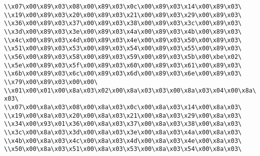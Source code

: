 \verb|\\x07\x00\x89\x03\x08\x00\x89\x03\x0c\x00\x89\x03\x14\x00\x89\x03\|\newline
\verb|\\x19\x00\x89\x03\x20\x00\x89\x03\x21\x00\x89\x03\x29\x00\x89\x03\|\newline
\verb|\\x36\x00\x89\x03\x37\x00\x89\x03\x38\x00\x89\x03\x3c\x00\x89\x03\|\newline
\verb|\\x3d\x00\x89\x03\x3e\x00\x89\x03\x4a\x00\x89\x03\x4b\x00\x89\x03\|\newline
\verb|\\x4c\x00\x89\x03\x4d\x00\x89\x03\x4e\x00\x89\x03\x50\x00\x89\x03\|\newline
\verb|\\x51\x00\x89\x03\x53\x00\x89\x03\x54\x00\x89\x03\x55\x00\x89\x03\|\newline
\verb|\\x56\x00\x89\x03\x58\x00\x89\x03\x59\x00\x89\x03\x5b\x00\xbe\x02\|\newline
\verb|\\x5e\x00\x89\x03\x5f\x00\x89\x03\x60\x00\x89\x03\x61\x00\x89\x03\|\newline
\verb|\\x6b\x00\x89\x03\x6c\x00\x89\x03\x6d\x00\x89\x03\x6e\x00\x89\x03\|\newline
\verb|\\x79\x00\x89\x03\x00\x00\|\newline
\verb|\\x01\x00\x01\x00\x8a\x03\x02\x00\x8a\x03\x03\x00\x8a\x03\x04\x00\x8a\x03\|\newline
\verb|\\x07\x00\x8a\x03\x08\x00\x8a\x03\x0c\x00\x8a\x03\x14\x00\x8a\x03\|\newline
\verb|\\x19\x00\x8a\x03\x20\x00\x8a\x03\x21\x00\x8a\x03\x29\x00\x8a\x03\|\newline
\verb|\\x34\x00\x93\x01\x36\x00\x8a\x03\x37\x00\x8a\x03\x38\x00\x8a\x03\|\newline
\verb|\\x3c\x00\x8a\x03\x3d\x00\x8a\x03\x3e\x00\x8a\x03\x4a\x00\x8a\x03\|\newline
\verb|\\x4b\x00\x8a\x03\x4c\x00\x8a\x03\x4d\x00\x8a\x03\x4e\x00\x8a\x03\|\newline
\verb|\\x50\x00\x8a\x03\x51\x00\x8a\x03\x53\x00\x8a\x03\x54\x00\x8a\x03\|\newline
